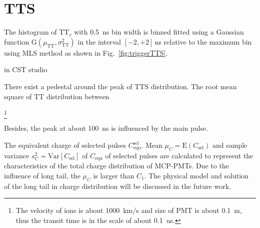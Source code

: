 \section{TTS}
The histogram of $\mathrm{TT}_r$ with \SI{0.5}{ns} bin width is binned fitted using a Gaussian function G$(\mu_{\mathrm{TT}},\sigma_{\mathrm{TT}}^2)$ in the interval $[-2,+2]$\,ns relative to the maximum bin using MLS method as shown in Fig.~\ref{fig:triggerTTS}.


in CST studio \cite{CST}


There exist a pedestal around the peak of TTS distribution. The root mean square of TT distribution between

\footnote{The velocity of ions is about \SI{1000}{km/s} and size of PMT is about \SI{0.1}{m}, thus the transit time is in the scale of about \SI{0.1}{us}.}

Besides, the peak at about \SI{100}{ns} is influenced by the main pulse.


The equivalent charge of selected pulses $C_{\mathrm{equ}}^{\mathrm{sel}}$. Mean $\mu_{C}=\mathrm{E}(C_{\mathrm{sel}})$ and sample variance $s^2_{C}=\mathrm{Var}[C_{\mathrm{sel}}]$ of $C_{\mathrm{equ}}$ of selected pulses are calculated to represent the characteristics of the total charge distribution of MCP-PMTs. Due to the influence of long tail, the $\mu_{C}$ is larger than $C_1$. The physical model and solution of the long tail in charge distribution will be discussed in the future work.